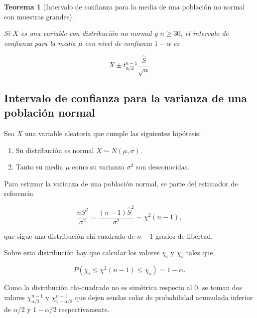 \documentclass[
  a4paper,
]{scrreport}
\providecommand{\tightlist}{%
  \setlength{\itemsep}{0pt}\setlength{\parskip}{0pt}}\usepackage{longtable,booktabs,array}
\theoremstyle{plain}
\newtheorem{theorem}{Teorema}[chapter]
\theoremstyle{definition}
\theoremstyle{definition}
\theoremstyle{remark}
\begin{document}
\begin{theorem}[Intervalo de confianza para la media de una población no
normal con muestras
grandes]\protect\hypertarget{thm-intervalo-confianza-media-no-normal}{}\label{thm-intervalo-confianza-media-no-normal}

Si \(X\) es una variable con distribución no normal y \(n\geq 30\), el
\emph{intervalo de confianza para la media} \(\mu\) con nivel de
confianza \(1-\alpha\) es

\[
\bar{X}\pm t^{n-1}_{\alpha/2}\frac{\hat{S}}{\sqrt{n}}
\]

\end{theorem}

\subsection{Intervalo de confianza para la varianza de una población
normal}\label{intervalo-de-confianza-para-la-varianza-de-una-poblaciuxf3n-normal}

Sea \(X\) una variable aleatoria que cumple las siguientes hipótesis:

\begin{enumerate}
\def\labelenumi{\arabic{enumi}.}
\tightlist
\item
  Su distribución es normal \(X\sim N(\mu,\sigma)\).
\item
  Tanto su media \(\mu\) como su varianza \(\sigma^2\) son desconocidas.
\end{enumerate}

Para estimar la varianza de una población normal, se parte del estimador
de referencia

\[
\frac{nS^2}{\sigma^2} = \frac{(n-1)\hat{S}^2}{\sigma^2}\sim \chi^2(n-1),
\]

que sigue una distribución chi-cuadrado de \(n-1\) grados de libertad.

Sobre esta distribución hay que calcular los valores \(\chi_i\) y
\(\chi_s\) tales que

\[
P(\chi_i\leq \chi^2(n-1) \leq \chi_s) = 1-\alpha.
\]

Como la distribución chi-cuadrado no es simétrica respecto al 0, se
toman dos valores \(\chi^{n-1}_{\alpha/2}\) y
\(\chi^{n-1}_{1-\alpha/2}\) que dejen sendas colas de probabilidad
acumulada inferior de \(\alpha/2\) y \(1-\alpha/2\) respectivamente.
\end{document}
